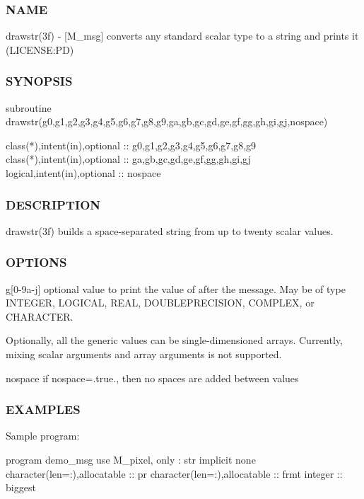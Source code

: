 \subsubsection*{N\+A\+ME}

drawstr(3f) -\/ \mbox{[}M\+\_\+msg\mbox{]} converts any standard scalar type to a string and prints it (L\+I\+C\+E\+N\+SE\+:PD) 

\subsubsection*{S\+Y\+N\+O\+P\+S\+IS}

\begin{DoxyVerb}subroutine drawstr(g0,g1,g2,g3,g4,g5,g6,g7,g8,g9,ga,gb,gc,gd,ge,gf,gg,gh,gi,gj,nospace)

 class(*),intent(in),optional  :: g0,g1,g2,g3,g4,g5,g6,g7,g8,g9
 class(*),intent(in),optional  :: ga,gb,gc,gd,ge,gf,gg,gh,gi,gj
 logical,intent(in),optional   :: nospace
\end{DoxyVerb}


\subsubsection*{D\+E\+S\+C\+R\+I\+P\+T\+I\+ON}

drawstr(3f) builds a space-\/separated string from up to twenty scalar values.

\subsubsection*{O\+P\+T\+I\+O\+NS}

g\mbox{[}0-\/9a-\/j\mbox{]} optional value to print the value of after the message. May be of type I\+N\+T\+E\+G\+ER, L\+O\+G\+I\+C\+AL, R\+E\+AL, D\+O\+U\+B\+L\+E\+P\+R\+E\+C\+I\+S\+I\+ON, C\+O\+M\+P\+L\+EX, or C\+H\+A\+R\+A\+C\+T\+ER.

Optionally, all the generic values can be single-\/dimensioned arrays. Currently, mixing scalar arguments and array arguments is not supported.

nospace if nospace=.true., then no spaces are added between values

\subsubsection*{E\+X\+A\+M\+P\+L\+ES}

Sample program\+:

program demo\+\_\+msg use M\+\_\+pixel, only \+: str implicit none character(len=\+:),allocatable \+:\+: pr character(len=\+:),allocatable \+:\+: frmt integer \+:\+: biggest

